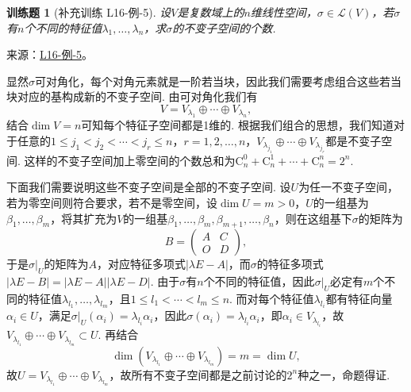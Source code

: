 \documentclass[12pt,fontset=fandol]{ctexart}
\newtheorem{exercise}{训练题}[section]
\begin{document}
\begin{exercise}[补充训练 L16-例-5]\label{prob:L16-例-5}
设$V$是复数域上的$n$维线性空间，$\sigma\in\mathcal{L}(V)$，若$\sigma$有$n$个不同的特征值$\lambda_1,\ldots,\lambda_n$，求$\sigma$的不变子空间的个数.
\end{exercise}
\noindent 来源：\href{https://github.com/yhwu-is/Linear-Algebra-Left-Undone/blob/new/%E8%AE%B2%E4%B9%89/%E4%B8%93%E9%A2%98/16%20%E8%8B%A5%E5%BD%93%E6%A0%87%E5%87%86%E5%BD%A2.tex}{L16-例-5}。
\begin{solve}
显然$\sigma$可对角化，每个对角元素就是一阶若当块，因此我们需要考虑组合这些若当块对应的基构成新的不变子空间. 由可对角化我们有
    \[V=V_{\lambda_1}\oplus\cdots\oplus V_{\lambda_n},\]
    结合$\dim V=n$可知每个特征子空间都是1维的. 根据我们组合的思想，我们知道对于任意的$1\leqslant j_1<j_2<\cdots<j_r\leqslant n$，$r=1,2,\ldots,n$，$V_{\lambda_{j_1}}\oplus\cdots\oplus V_{\lambda_{j_r}}$都是不变子空间. 这样的不变子空间加上零空间的个数总和为$\mathrm{C}_n^0+\mathrm{C}_n^1+\cdots+\mathrm{C}_n^n=2^n$.

    下面我们需要说明这些不变子空间是全部的不变子空间. 设$U$为任一不变子空间，若为零空间则符合要求，若不是零空间，设$\dim U=m>0$，$U$的一组基为$\beta_1,\ldots,\beta_m$，将其扩充为$V$的一组基$\beta_1,\ldots,\beta_m,\beta_{m+1},\ldots,\beta_n$，则在这组基下$\sigma$的矩阵为
    \[B=\begin{pmatrix}
            A & C \\ O & D
        \end{pmatrix},\]
    于是$\sigma\vert_U$的矩阵为$A$，对应特征多项式$|\lambda E-A|$，而$\sigma$的特征多项式$|\lambda E-B|=|\lambda E-A||\lambda E-D|$. 由于$\sigma$有$n$个不同的特征值，因此$\sigma\vert_U$必定有$m$个不同的特征值$\lambda_{l_1},\ldots,\lambda_{l_m}$，且$1\leqslant l_1<\cdots<l_m\leqslant n$. 而对每个特征值$\lambda_{l_i}$都有特征向量$\alpha_i\in U$，满足$\sigma\vert_U(\alpha_i)=\lambda_{l_i}\alpha_i$，因此$\sigma(\alpha_i)=\lambda_{l_i}\alpha_i$，即$\alpha_i\in V_{\lambda_{l_i}}$，故$V_{\lambda_{l_1}}\oplus\cdots\oplus V_{\lambda_{l_m}}\subset U$. 再结合
    \[\dim(V_{\lambda_{l_1}}\oplus\cdots\oplus V_{\lambda_{l_m}})=m=\dim U,\]
    故$U=V_{\lambda_{l_1}}\oplus\cdots\oplus V_{\lambda_{l_m}}$，故所有不变子空间都是之前讨论的$2^n$种之一，命题得证.
\end{solve}
\end{document}
